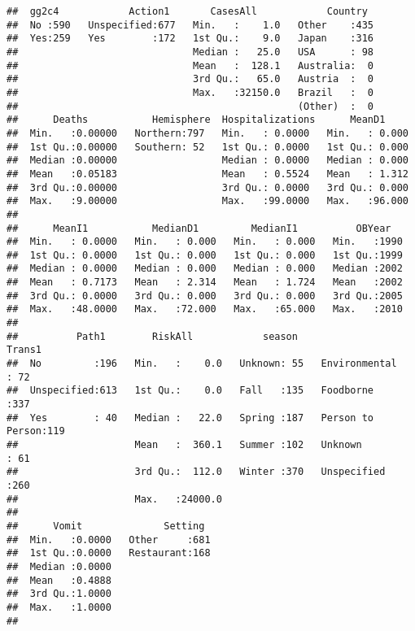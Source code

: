\documentclass[]{article}
\begin{document}
\begin{verbatim}
##  gg2c4            Action1       CasesAll            Country   
##  No :590   Unspecified:677   Min.   :    1.0   Other    :435  
##  Yes:259   Yes        :172   1st Qu.:    9.0   Japan    :316  
##                              Median :   25.0   USA      : 98  
##                              Mean   :  128.1   Australia:  0  
##                              3rd Qu.:   65.0   Austria  :  0  
##                              Max.   :32150.0   Brazil   :  0  
##                                                (Other)  :  0  
##      Deaths           Hemisphere  Hospitalizations      MeanD1      
##  Min.   :0.00000   Northern:797   Min.   : 0.0000   Min.   : 0.000  
##  1st Qu.:0.00000   Southern: 52   1st Qu.: 0.0000   1st Qu.: 0.000  
##  Median :0.00000                  Median : 0.0000   Median : 0.000  
##  Mean   :0.05183                  Mean   : 0.5524   Mean   : 1.312  
##  3rd Qu.:0.00000                  3rd Qu.: 0.0000   3rd Qu.: 0.000  
##  Max.   :9.00000                  Max.   :99.0000   Max.   :96.000  
##                                                                     
##      MeanI1           MedianD1         MedianI1          OBYear    
##  Min.   : 0.0000   Min.   : 0.000   Min.   : 0.000   Min.   :1990  
##  1st Qu.: 0.0000   1st Qu.: 0.000   1st Qu.: 0.000   1st Qu.:1999  
##  Median : 0.0000   Median : 0.000   Median : 0.000   Median :2002  
##  Mean   : 0.7173   Mean   : 2.314   Mean   : 1.724   Mean   :2002  
##  3rd Qu.: 0.0000   3rd Qu.: 0.000   3rd Qu.: 0.000   3rd Qu.:2005  
##  Max.   :48.0000   Max.   :72.000   Max.   :65.000   Max.   :2010  
##                                                                    
##          Path1        RiskAll            season                 Trans1   
##  No         :196   Min.   :    0.0   Unknown: 55   Environmental   : 72  
##  Unspecified:613   1st Qu.:    0.0   Fall   :135   Foodborne       :337  
##  Yes        : 40   Median :   22.0   Spring :187   Person to Person:119  
##                    Mean   :  360.1   Summer :102   Unknown         : 61  
##                    3rd Qu.:  112.0   Winter :370   Unspecified     :260  
##                    Max.   :24000.0                                       
##                                                                          
##      Vomit              Setting   
##  Min.   :0.0000   Other     :681  
##  1st Qu.:0.0000   Restaurant:168  
##  Median :0.0000                   
##  Mean   :0.4888                   
##  3rd Qu.:1.0000                   
##  Max.   :1.0000                   
## 
\end{verbatim}
\end{document}
